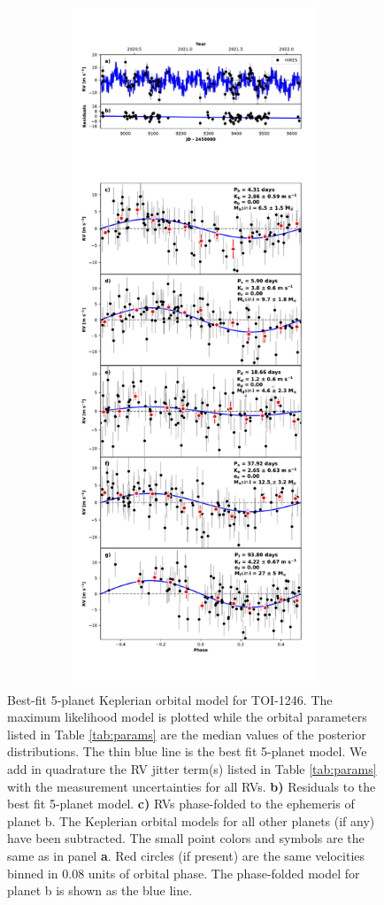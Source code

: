 \documentclass{emulateapj}
\begin{document}
\begin{figure}[!h]
\centering 

\includegraphics[height=8.0in,width=6.0in,keepaspectratio]{TOI-1246_default_rv_multipanel.pdf}
\caption{ Best-fit 5-planet Keplerian orbital model
  for TOI-1246. The maximum likelihood model is plotted while
  the orbital parameters listed in Table \ref{tab:params} are the
  median values of the posterior distributions.  The thin blue line is
  the best fit 5-planet model. We add in quadrature
  the RV jitter term(s) listed in Table \ref{tab:params} with the
  measurement uncertainties for all RVs.  {\bf b)} Residuals to the
  best fit 5-planet model. {\bf c)} RVs phase-folded
  to the ephemeris of planet b. The Keplerian orbital models for all
  other planets (if any) have been subtracted.  The small point colors
  and symbols are the same as in panel {\bf a}.  Red circles (if
  present) are the same velocities binned in 0.08 units of orbital
  phase.  The phase-folded model for planet b is shown as the blue
  line.}
\end{figure}
 
\end{document}
